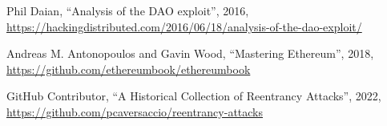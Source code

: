 \begin{thebibliography}{90}

Phil Daian, ``Analysis of the DAO exploit'', 2016,
\url{https://hackingdistributed.com/2016/06/18/analysis-of-the-dao-exploit/}


Andreas M. Antonopoulos and Gavin Wood, 
``Mastering Ethereum'', 2018,
\url{https://github.com/ethereumbook/ethereumbook}


GitHub Contributor, 
``A Historical Collection of Reentrancy Attacks'', 2022,
\url{https://github.com/pcaversaccio/reentrancy-attacks}

\end{thebibliography}


